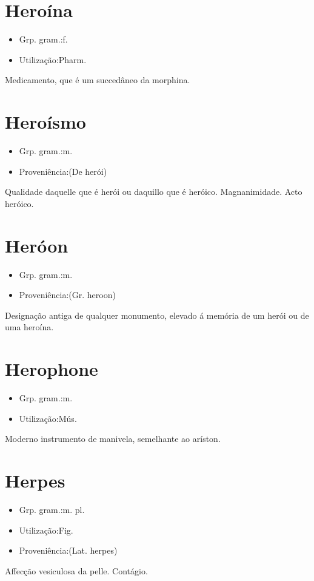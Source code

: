 \documentclass{article}
\begin{document}
\section{Heroína}
\begin{itemize}
\item {Grp. gram.:f.}
\end{itemize}
\begin{itemize}
\item {Utilização:Pharm.}
\end{itemize}
Medicamento, que é um succedâneo da morphina.
\section{Heroísmo}
\begin{itemize}
\item {Grp. gram.:m.}
\end{itemize}
\begin{itemize}
\item {Proveniência:(De \textunderscore herói\textunderscore )}
\end{itemize}
Qualidade daquelle que é herói ou daquillo que é heróico.
Magnanimidade.
Acto heróico.
\section{Heróon}
\begin{itemize}
\item {Grp. gram.:m.}
\end{itemize}
\begin{itemize}
\item {Proveniência:(Gr. \textunderscore heroon\textunderscore )}
\end{itemize}
Designação antiga de qualquer monumento, elevado á memória de um herói ou de uma heroína.
\section{Herophone}
\begin{itemize}
\item {Grp. gram.:m.}
\end{itemize}
\begin{itemize}
\item {Utilização:Mús.}
\end{itemize}
Moderno instrumento de manivela, semelhante ao aríston.
\section{Herpes}
\begin{itemize}
\item {Grp. gram.:m. pl.}
\end{itemize}
\begin{itemize}
\item {Utilização:Fig.}
\end{itemize}
\begin{itemize}
\item {Proveniência:(Lat. \textunderscore herpes\textunderscore )}
\end{itemize}
Affecção vesiculosa da pelle.
Contágio.
\end{document}
